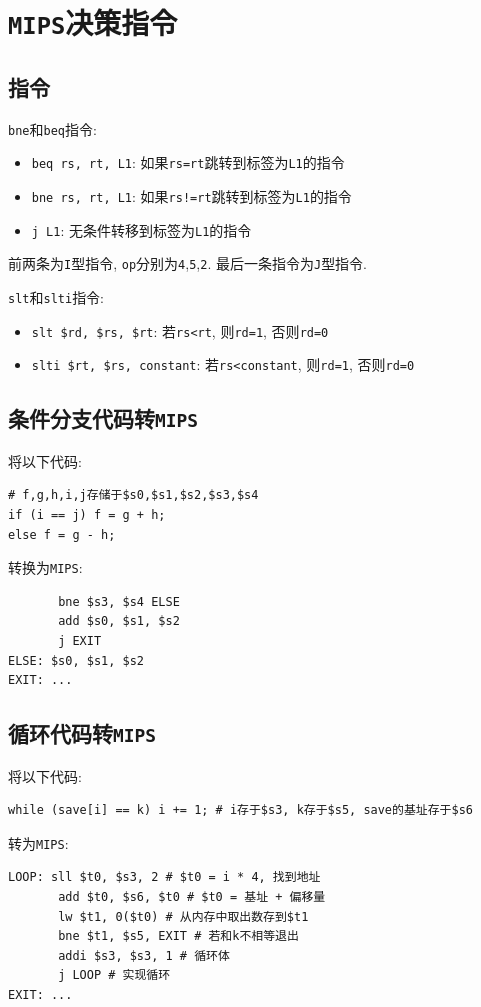 \section{\texttt{MIPS}决策指令}
\subsection{指令}
\verb|bne|和\verb|beq|指令:
\begin{itemize}
\item \verb|beq rs, rt, L1|: 如果\verb|rs=rt|跳转到标签为\verb|L1|的指令
\item \verb|bne rs, rt, L1|: 如果\verb|rs!=rt|跳转到标签为\verb|L1|的指令
\item \verb|j L1|: 无条件转移到标签为\verb|L1|的指令
\end{itemize}\par
前两条为\verb|I|型指令, \verb|op|分别为\verb|4|,\verb|5|,\verb|2|. 最后一条指令为\verb|J|型指令.\par
\verb|slt|和\verb|slti|指令:
\begin{itemize}
\item \verb|slt $rd, $rs, $rt|: 若\verb|rs<rt|, 则\verb|rd=1|, 否则\verb|rd=0|
\item \verb|slti $rt, $rs, constant|: 若\verb|rs<constant|, 则\verb|rd=1|, 否则\verb|rd=0|
\end{itemize}
\subsection{条件分支代码转\texttt{MIPS}}
将以下代码:
\begin{lstlisting}
# f,g,h,i,j存储于$s0,$s1,$s2,$s3,$s4
if (i == j) f = g + h;
else f = g - h;
\end{lstlisting}\par
转换为\texttt{MIPS}:
\begin{lstlisting}
       bne $s3, $s4 ELSE
       add $s0, $s1, $s2
       j EXIT
ELSE: $s0, $s1, $s2
EXIT: ...
\end{lstlisting}
\subsection{循环代码转\texttt{MIPS}}
将以下代码:
\begin{lstlisting}
while (save[i] == k) i += 1; # i存于$s3, k存于$s5, save的基址存于$s6
\end{lstlisting}\par
转为\texttt{MIPS}:
\begin{lstlisting}
LOOP: sll $t0, $s3, 2 # $t0 = i * 4, 找到地址
       add $t0, $s6, $t0 # $t0 = 基址 + 偏移量
       lw $t1, 0($t0) # 从内存中取出数存到$t1
       bne $t1, $s5, EXIT # 若和k不相等退出
       addi $s3, $s3, 1 # 循环体
       j LOOP # 实现循环
EXIT: ...
\end{lstlisting}

